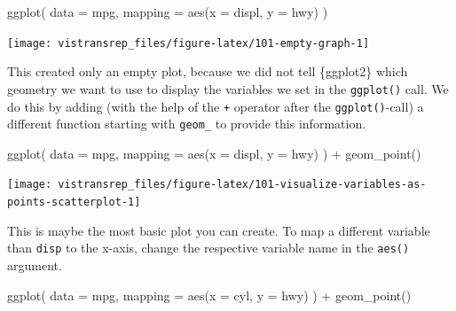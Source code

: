 \documentclass[]{book}
\newenvironment{Shaded}{}{}
\newcommand{\DataTypeTok}[1]{#1}
\newcommand{\KeywordTok}[1]{\textcolor[rgb]{0.00,0.00,1.00}{#1}}
\newcommand{\NormalTok}[1]{#1}
\newcommand{\OperatorTok}[1]{#1}
\newcommand{\StringTok}[1]{\textcolor[rgb]{0.00,0.50,0.50}{#1}}
\begin{document}
\begin{Shaded}
\begin{Highlighting}[]
\KeywordTok{ggplot}\NormalTok{(}
  \DataTypeTok{data =}\NormalTok{ mpg,}
  \DataTypeTok{mapping =} \KeywordTok{aes}\NormalTok{(}\DataTypeTok{x =}\NormalTok{ displ, }\DataTypeTok{y =}\NormalTok{ hwy)}
\NormalTok{)}
\end{Highlighting}
\end{Shaded}

\begin{flushright}\texttt{[image: vistransrep\_files/figure-latex/101-empty-graph-1]} \end{flushright}

This created only an empty plot, because we did not tell \{ggplot2\} which geometry we want to use to display the variables we set in the \texttt{ggplot()} call.
We do this by adding (with the help of the \texttt{+} operator after the \texttt{ggplot()}-call) a different function starting with \texttt{geom\_} to provide this information.

\begin{Shaded}
\begin{Highlighting}[]
\KeywordTok{ggplot}\NormalTok{(}
  \DataTypeTok{data =}\NormalTok{ mpg,}
  \DataTypeTok{mapping =} \KeywordTok{aes}\NormalTok{(}\DataTypeTok{x =}\NormalTok{ displ, }\DataTypeTok{y =}\NormalTok{ hwy)}
\NormalTok{) }\OperatorTok{+}
\StringTok{  }\KeywordTok{geom_point}\NormalTok{()}
\end{Highlighting}
\end{Shaded}

\begin{flushright}\texttt{[image: vistransrep\_files/figure-latex/101-visualize-variables-as-points-scatterplot-1]} \end{flushright}

This is maybe the most basic plot you can create.
To map a different variable than \texttt{disp} to the x-axis, change the respective variable name in the \texttt{aes()} argument.

\begin{Shaded}
\begin{Highlighting}[]
\KeywordTok{ggplot}\NormalTok{(}
  \DataTypeTok{data =}\NormalTok{ mpg,}
  \DataTypeTok{mapping =} \KeywordTok{aes}\NormalTok{(}\DataTypeTok{x =}\NormalTok{ cyl, }\DataTypeTok{y =}\NormalTok{ hwy)}
\NormalTok{) }\OperatorTok{+}
\StringTok{  }\KeywordTok{geom_point}\NormalTok{()}
\end{Highlighting}
\end{Shaded}
\end{document}
